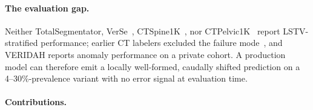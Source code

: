 \documentclass{article}
\newcommand{\SOTA}{TotalSegmentator}
\newcommand{\VERIDAH}{VERIDAH}
\newcommand{\VerSe}{VerSe}
\begin{document}
\paragraph{The evaluation gap.}
Neither \SOTA{}, \VerSe{}~\citep{Sekuboyina2021VerSe:Images},
CTSpine1K~\citep{Deng2021CTSpine1K:Tomography}, nor
CTPelvic1K~\citep{Liu2021DeepModels} report LSTV-stratified
performance; earlier CT labelers excluded the failure
mode~\citep{Sekuboyina2020LabelingAnatomy}, and \VERIDAH{}
reports anomaly performance on a private cohort. A
production model can therefore emit a locally
well-formed, caudally shifted prediction on a
4--30\%-prevalence variant with no error signal at
evaluation time.

\paragraph{Contributions.}
\end{document}

